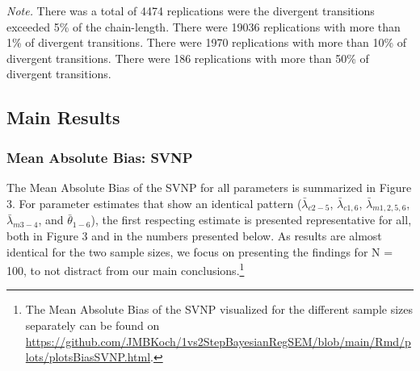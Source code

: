 \documentclass[
  man, donotrepeattitle,floatsintext]{apa6}
\begin{document}
\begin{table}[tbp]
\begin{center}
\begin{threeparttable}
\begin{tablenotes}[para]
\normalsize{\textit{Note.} There was a total of 4474 replications were the divergent transitions exceeded 5\% of the chain-length. There were 19036 replications with more than 1\% of divergent transitions. There were 1970 replications with more than 10\% of divergent transitions. There were 186 replications with more than 50\% of divergent transitions.}
\end{tablenotes}

\end{threeparttable}
\end{center}

\end{table}

\hypertarget{main-results}{%
\subsection{Main Results}\label{main-results}}

\hypertarget{mean-absolute-bias-svnp}{%
\subsubsection{Mean Absolute Bias: SVNP}\label{mean-absolute-bias-svnp}}

The Mean Absolute Bias of the SVNP for all parameters is summarized in Figure 3. For parameter estimates that show an identical pattern (\(\bar{\lambda}_{c 2-5}\), \(\bar{\lambda}_{c 1, 6}\), \(\bar{\lambda}_{m 1, 2, 5, 6}\), \(\bar{\lambda}_{m 3-4}\), and \(\bar{\theta}_{1-6}\)), the first respecting estimate is presented representative for all, both in Figure 3 and in the numbers presented below. As results are almost identical for the two sample sizes, we focus on presenting the findings for N = 100, to not distract from our main conclusions.\footnote{The Mean Absolute Bias of the SVNP visualized for the different sample sizes separately can be found on \url{https://github.com/JMBKoch/1vs2StepBayesianRegSEM/blob/main/Rmd/plots/plotsBiasSVNP.html}.}
\end{document}
